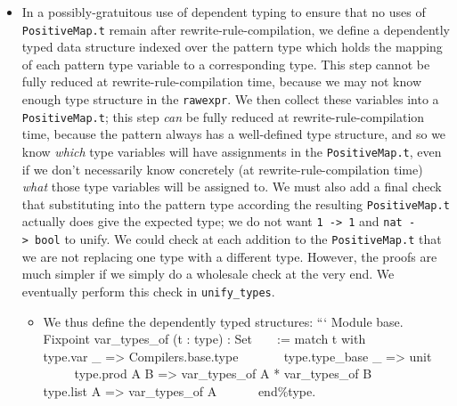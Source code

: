 \begin{itemize}
\begin{itemize}
  \item
    In a possibly-gratuitous use of dependent typing to ensure that no
    uses of \texttt{PositiveMap.t} remain after
    rewrite-rule-compilation, we define a dependently typed data
    structure indexed over the pattern type which holds the mapping of
    each pattern type variable to a corresponding type. This step cannot
    be fully reduced at rewrite-rule-compilation time, because we may
    not know enough type structure in the \texttt{rawexpr}. We then
    collect these variables into a \texttt{PositiveMap.t}; this step
    \emph{can} be fully reduced at rewrite-rule-compilation time,
    because the pattern always has a well-defined type structure, and so
    we know \emph{which} type variables will have assignments in the
    \texttt{PositiveMap.t}, even if we don't necessarily know concretely
    (at rewrite-rule-compilation time) \emph{what} those type variables
    will be assigned to. We must also add a final check that
    substituting into the pattern type according the resulting
    \texttt{PositiveMap.t} actually does give the expected type; we do
    not want
    \texttt{\textquotesingle{}1\ -\textgreater{}\ \textquotesingle{}1}
    and \texttt{nat\ -\textgreater{}\ bool} to unify. We could check at
    each addition to the \texttt{PositiveMap.t} that we are not
    replacing one type with a different type. However, the proofs are
    much simpler if we simply do a wholesale check at the very end. We
    eventually perform this check in \texttt{unify\_types}.

    \begin{itemize}
    \tightlist
    \item
      We thus define the dependently typed structures: ``` Module base.
      ~ Fixpoint var\_types\_of (t : type) : Set ~ ~ := match t with ~ ~
      ~ ~\textbar{} type.var \_ =\textgreater{} Compilers.base.type ~ ~
      ~ ~\textbar{} type.type\_base \_ =\textgreater{} unit ~ ~ ~
      ~\textbar{} type.prod A B =\textgreater{} var\_types\_of A *
      var\_types\_of B ~ ~ ~ ~\textbar{} type.list A =\textgreater{}
      var\_types\_of A ~ ~ ~ ~end\%type.
    \end{itemize}


\end{itemize}
\end{itemize}

